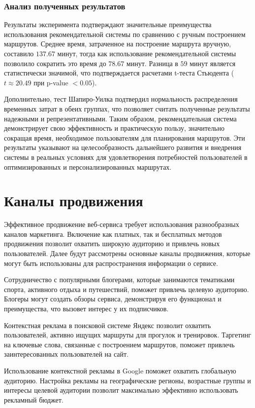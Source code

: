 \subsubsection{Анализ полученных результатов}
Результаты эксперимента подтверждают значительные преимущества использования рекомендательной системы по сравнению с ручным построением маршрутов. Среднее время, затраченное на построение маршрута вручную, составило $137.67$ минут, тогда как использование рекомендательной системы позволило сократить это время до $78.67$ минут. Разница в $59$ минут является статистически значимой, что подтверждается расчетами t-теста Стьюдента ($t \approx 20.49$ при p-value $< 0.05$).

Дополнительно, тест Шапиро-Уилка подтвердил нормальность распределения временных затрат в обеих группах, что позволяет считать полученные результаты надежными и репрезентативными. Таким образом, рекомендательная система демонстрирует свою эффективность и практическую пользу, значительно сокращая время, необходимое пользователям для планирования маршрутов. Эти результаты указывают на целесообразность дальнейшего развития и внедрения системы в реальных условиях для удовлетворения потребностей пользователей в оптимизированных и персонализированных маршрутах.


\section{Каналы продвижения}

Эффективное продвижение веб-сервиса требует использования разнообразных каналов маркетинга. Включение как платных, так и бесплатных методов продвижения позволит охватить широкую аудиторию и привлечь новых пользователей. Далее будут рассмотрены основные каналы продвижения, которые могут быть использованы для распространения информации о сервисе.

Сотрудничество с популярными блогерами, которые занимаются тематиками спорта, активного отдыха и путешествий, поможет привлечь целевую аудиторию. Блогеры могут создать обзоры сервиса, демонстрируя его функционал и преимущества, что вызовет интерес у их подписчиков.

Контекстная реклама в поисковой системе Яндекс позволит охватить пользователей, активно ищущих маршруты для прогулок и тренировок. Таргетинг на ключевые слова, связанные с построением маршрутов, поможет привлечь заинтересованных пользователей на сайт.

Использование контекстной рекламы в Google поможет охватить глобальную аудиторию. Настройка рекламы на географические регионы, возрастные группы и интересы целевой аудитории позволит максимально эффективно использовать рекламный бюджет.

